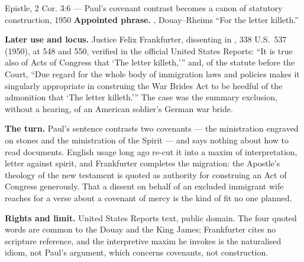 \begin{afterlife}{Epistle, 2 Cor. 3:6 --- Paul's covenant contrast becomes a canon of statutory construction, 1950}
\textbf{Appointed phrase.} , Douay--Rheims ``For
the letter killeth.''

\textbf{Later use and locus.} Justice Felix Frankfurter, dissenting in
, 338 U.S.\ 537 (1950), at
548 and 550, verified in the official United States Reports: ``It is true also
of Acts of Congress that `The letter killeth,''' and, of the statute before
the Court, ``Due regard for the whole body of immigration laws and policies
makes it singularly appropriate in construing the War Brides Act to be heedful
of the admonition that `The letter killeth.'\thinspace'' The case was the
summary exclusion, without a hearing, of an American soldier's German war
bride.

\textbf{The turn.} Paul's sentence contrasts two covenants --- the
ministration engraved on stones and the ministration of the Spirit --- and
says nothing about how to read documents. English usage long ago re-cut it
into a maxim of interpretation, letter against spirit, and Frankfurter
completes the migration: the Apostle's theology of the new testament is quoted
as authority for construing an Act of Congress generously. That a dissent on
behalf of an excluded immigrant wife reaches for a verse about a covenant of
mercy is the kind of fit no one planned.

\textbf{Rights and limit.} United States Reports text, public domain. The four
quoted words are common to the Douay and the King James; Frankfurter cites no
scripture reference, and the interpretive maxim he invokes is the naturalised
idiom, not Paul's argument, which concerns covenants, not construction.
\end{afterlife}

